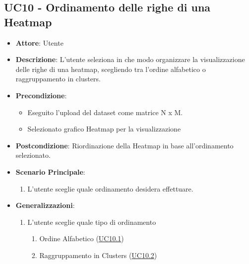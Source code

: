     \subsection{UC10 - Ordinamento delle righe di una Heatmap}
    \begin{itemize}
    \item \textbf{Attore}: Utente
    \item \textbf{Descrizione}: L'utente seleziona in che modo organizzare la visualizzazione delle righe di una heatmap, scegliendo tra l'ordine alfabetico o raggruppamento in clusters.
    \item \textbf{Precondizione}: 
    \begin{itemize}
        \item Eseguito l'upload del dataset come matrice N x M.
        \item Selezionato grafico Heatmap per la visualizzazione
    \end{itemize}  
    \item \textbf{Postcondizione}: Riordinazione della Heatmap in base all'ordinamento selezionato.
    \item \textbf{Scenario Principale}: 
    \begin{enumerate}
        \item L'utente sceglie quale ordinamento desidera effettuare.
    \end{enumerate}  
    \item \textbf{Generalizzazioni}: 
     \begin{enumerate}
            \item L'utente sceglie quale tipo di ordinamento
                \begin{enumerate}
                    \item Ordine Alfabetico (\hyperref[uc10.1]{UC10.1})
                    \item Raggruppamento in Clusters (\hyperref[uc10.2]{UC10.2})
                    \end{enumerate}
        \end{enumerate} 
    \end{itemize}
    
